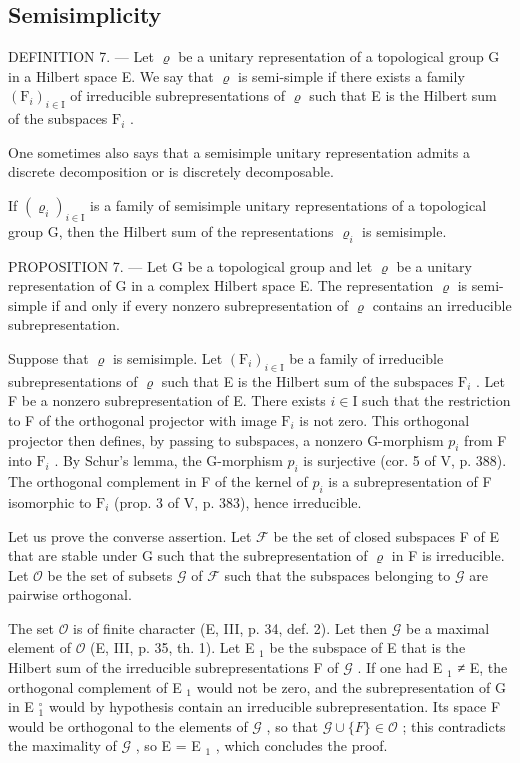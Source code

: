 \subsection{Semisimplicity}

DEFINITION 7. --- Let \(\varrho\) be a unitary representation of a topological group G in a Hilbert space E. We say that \(\varrho\) is semi-simple if there exists a family \((\mathrm{F}_i)_{i\in \mathrm{I}}\) of irreducible subrepresentations of \(\varrho\) such that E is the Hilbert sum of the subspaces \(\mathrm{F}_i\) .

One sometimes also says that a semisimple unitary representation admits a discrete decomposition or is discretely decomposable.

If \((\varrho_{i})_{i\in\mathrm{I}}\) is a family of semisimple unitary representations of a topological group G, then the Hilbert sum of the representations \(\varrho_{i}\) is semisimple.

PROPOSITION 7. --- Let G be a topological group and let \(\varrho\) be a unitary representation of G in a complex Hilbert space E. The representation \(\varrho\) is semi-simple if and only if every nonzero subrepresentation of \(\varrho\) contains an irreducible subrepresentation.

Suppose that \(\varrho\) is semisimple. Let \((\mathrm{F}_i)_{i\in \mathrm{I}}\) be a family of irreducible subrepresentations of \(\varrho\) such that E is the Hilbert sum of the subspaces \(\mathrm{F}_i\) . Let F be a nonzero subrepresentation of E. There exists \(i\in \mathrm{I}\) such that the restriction to F of the orthogonal projector with image \(\mathrm{F}_i\) is not zero. This orthogonal projector then defines, by passing to subspaces, a nonzero G-morphism \(p_i\) from F into \(\mathrm{F}_i\) . By Schur's lemma, the G-morphism \(p_i\) is surjective (cor. 5 of V, p. 388). The orthogonal complement in F of the kernel of \(p_i\) is a subrepresentation of F isomorphic to \(\mathrm{F}_i\) (prop. 3 of V, p. 383), hence irreducible.

Let us prove the converse assertion. Let \(\mathcal{F}\) be the set of closed subspaces F of E that are stable under G such that the subrepresentation of \(\varrho\) in F is irreducible. Let \(\mathcal{O}\) be the set of subsets \(\mathcal{G}\) of \(\mathcal{F}\) such that the subspaces belonging to \(\mathcal{G}\) are pairwise orthogonal.

The set \(\mathcal{O}\) is of finite character (E, III, p. 34, def. 2). Let then \(\mathcal{G}\) be a maximal element of \(\mathcal{O}\) (E, III, p. 35, th. 1). Let E \(_1\) be the subspace of E that is the Hilbert sum of the irreducible subrepresentations F of \(\mathcal{G}\) . If one had E \(_1\) ≠ E, the orthogonal complement of E \(_1\) would not be zero, and the subrepresentation of G in E \(_1^{\circ}\) would by hypothesis contain an irreducible subrepresentation. Its space F would be orthogonal to the elements of \(\mathcal{G}\) , so that \(\mathcal{G} \cup \{F\} \in \mathcal{O}\) ; this contradicts the maximality of \(\mathcal{G}\) , so E = E \(_1\) , which concludes the proof.

